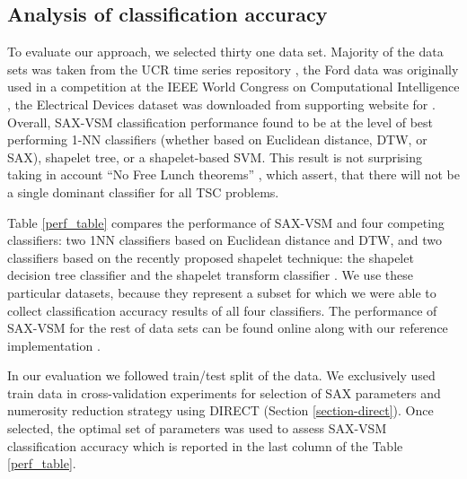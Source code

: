 \documentclass{llncs}
\begin{document}
\subsection{Analysis of classification accuracy}
To evaluate our approach, we selected thirty one data set. Majority of the data sets was taken 
from the UCR time series repository \cite{ucr}, the Ford data was originally used in a competition
at the IEEE World Congress on Computational Intelligence \cite{ford}, the Electrical Devices
dataset was downloaded from supporting website for \cite{bagnal}. Overall, SAX-VSM classification 
performance found to be at the level of best performing 1-NN classifiers (whether based on 
Euclidean distance, DTW, or SAX), shapelet tree, or a shapelet-based SVM. 
This result is not surprising taking in account ``No Free Lunch theorems'' \cite{nfl}, which 
assert, that there will not be a single dominant classifier for all TSC problems.

Table \ref{perf_table} compares the performance of SAX-VSM and four competing classifiers: 
two 1NN classifiers based on Euclidean distance and DTW, and two classifiers 
based on the recently proposed shapelet technique: the shapelet decision tree \cite{shapelet}
classifier and the shapelet transform classifier \cite{bagnal}. We use these 
particular datasets, because they represent a subset for which we were able to collect
classification accuracy results of all four classifiers. 
The performance of SAX-VSM for the rest of data sets can be found online along with 
our reference implementation \cite{jmotif}.

In our evaluation we followed train/test split of the data. We exclusively used train data in 
cross-validation experiments for selection of SAX parameters and numerosity reduction strategy
using DIRECT (Section \ref{section-direct}). Once selected, the optimal set of parameters 
was used to assess SAX-VSM classification accuracy which is reported in the last column 
of the Table \ref{perf_table}.
\end{document}
